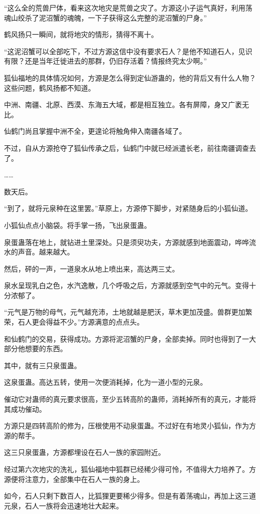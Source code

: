 \begin{this_body}
“这么全的荒兽尸体，看来这次地灾是荒兽之灾了。方源这小子运气真好，利用荡魂山绞杀了泥沼蟹的魂魄，一下子获得这么完整的泥沼蟹的尸身。”

鹤风扬只一瞬间，就将地灾的情形，猜得不离十。

“这泥沼蟹可以全部吃下，不过方源这信中没有要求石人？是他不知道石人，见识有限？还是当年迁徙进去的那群，仍旧存活着？情报终究太少啊。”

狐仙福地的具体情况如何，方源是怎么得到定仙游蛊的，他的背后又有什么人物？这些问题，鹤风扬都不知道。

中洲、南疆、北原、西漠、东海五大域，都是相互独立。各有屏障，身又广袤无比。

仙鹤门尚且掌握中洲不全，更遑论将触角伸入南疆各域了。

不过，自从方源抢夺了狐仙传承之后，仙鹤门中就已经派遣长老，前往南疆调查去了。

……

数天后。

“到了，就将元泉种在这里罢。”草原上，方源停下脚步，对紧随身后的小狐仙道。

小狐仙点点小脑袋。将手掌一扬，飞出泉蛋蛊。

泉蛋蛊落在地上，就钻进土里深处。只是须臾功夫，方源就感到地面震动，哗哗流水的声音。越来越大。

然后，砰的一声，一道泉水从地上喷出来，高达两三丈。

泉水呈现乳白之色，水汽逸散，几个呼吸之后，方源就感到空气中的元气。变得十分浓郁了。

“元气是万物的母气，元气越充沛，土地就越是肥沃，草木更加茂盛。兽群更加繁荣，石人更会得益不少。”方源满意的点点头。

和仙鹤门的交易，获得成功。方源将泥沼蟹的尸身，全部卖掉。同时也得到了一大部分他想要的东西。

其中，就有三只泉蛋蛊。

这泉蛋蛊。高达五转，使用一次便消耗掉，化为一道小型的元泉。

催动它对蛊师的真元要求很高，至少五转高阶的蛊师，消耗掉所有的真元，才能将其成功催动。

方源只是四转高阶的修为，压根使用不动泉蛋蛊。不过好在有地灵小狐仙，作为方源的帮手。

这三只泉蛋蛊，方源都埋设在石人一族的家园附近。

经过第六次地灾的洗礼，狐仙福地中狐群已经稀少得可怜，不值得大力培养了。方源便将注意力，全部集中在石人一族的身上。

如今，石人只剩下数百人，比狐狸更要稀少得多。但是有着荡魂山，再加上这三道元泉，石人一族将会迅速地壮大起来。


\end{this_body}
